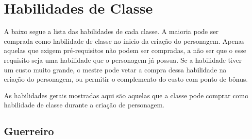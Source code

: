 \section{Habilidades de Classe}

A baixo segue a lista das habilidades de cada classe. A maioria pode ser comprada como habilidade de classe no inicio da criação do personagem. Apenas aquelas que exigem pré-requisitos não podem ser compradas, a não ser que o esse requisito seja uma habilidade que o personagem já possua. Se a habilidade tiver um custo muito grande, o mestre pode vetar a compra dessa habilidade na criação do personagem, ou permitir o complemento do custo com ponto de bônus.

As habilidades gerais mostradas aqui são aquelas que a classe pode comprar como habilidade de classe durante a criação de personagem.

\subsection{Guerreiro}
 
